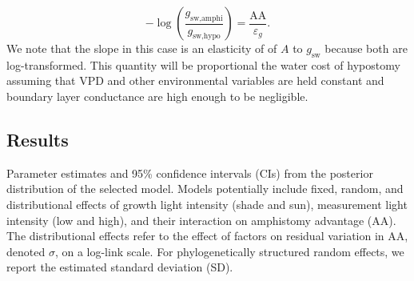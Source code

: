 \documentclass[
  letterpaper,
  DIV=11,
  numbers=noendperiod]{scrartcl}
\newcommand{\gsw}{$g_\text{sw}$}
\begin{document}
\[-\log\left(\frac{g_\text{sw,amphi}}{g_\text{sw,hypo}}\right) = \frac{\mathrm{AA}}{\varepsilon_g}.\]
We note that the slope in this case is an elasticity of of \(A\) to
\gsw{} because both are log-transformed. This quantity will be
proportional the water cost of hypostomy assuming that VPD and other
environmental variables are held constant and boundary layer conductance
are high enough to be negligible.

\subsection{Results}\label{results}

\begin{table}

\caption{\label{tbl-fit_aa1}Parameter estimates and 95\% confidence
intervals (CIs) from the posterior distribution of the selected model.
Models potentially include fixed, random, and distributional effects of
growth light intensity (shade and sun), measurement light intensity (low
and high), and their interaction on amphistomy advantage
(\(\mathrm{AA}\)). The distributional effects refer to the effect of
factors on residual variation in \(\mathrm{AA}\), denoted \(\sigma\), on
a log-link scale. For phylogenetically structured random effects, we
report the estimated standard deviation (SD).}

\centering{

}
\end{table}
\end{document}
